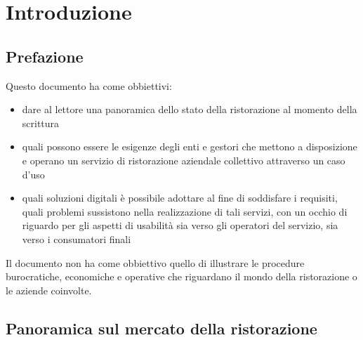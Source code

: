 \documentclass[a4paper, titlepage, 12pt, openright, twoside]{book}
\begin{document}
\begin{frontespizio}
\end{frontespizio}

\tableofcontents

\chapter{Introduzione}\label{chap:introduzione}

\section{Prefazione}

Questo documento ha come obbiettivi:
\begin{itemize}
	\item dare al lettore una panoramica dello stato della ristorazione al momento della scrittura
	\item quali possono essere le esigenze degli enti e gestori che mettono a disposizione e operano un servizio di ristorazione aziendale collettivo attraverso un caso d'uso
	\item quali soluzioni digitali è possibile adottare al fine di soddisfare i requisiti, quali problemi sussistono nella realizzazione di tali servizi, con un occhio di riguardo per
		  gli aspetti di usabilità sia verso gli operatori del servizio, sia verso i consumatori finali
\end{itemize}

Il documento non ha come obbiettivo quello di illustrare le procedure burocratiche, economiche e operative che riguardano il mondo della ristorazione o le aziende coinvolte.

\section{Panoramica sul mercato della ristorazione}
\end{document}
